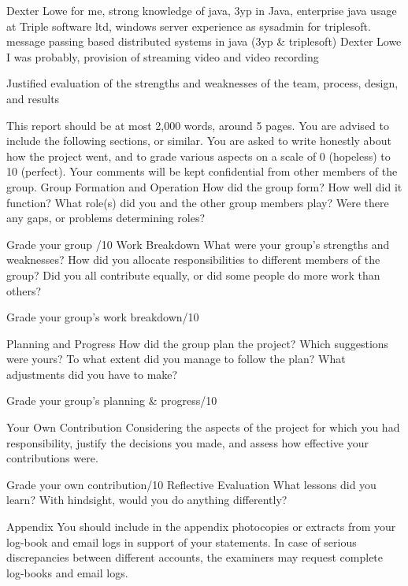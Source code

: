 Dexter Lowe for me, strong knowledge of java, 3yp in Java, enterprise java usage at Triple software ltd, windows server experience as sysadmin for triplesoft. message passing based distributed systems in java (3yp & triplesoft) Dexter Lowe I was probably, provision of streaming video and video recording



Justified evaluation of the strengths and weaknesses of the team, process, design, and results



 
 
This report should be at most 2,000 words, around 5 pages.  You are advised to include the following sections, or similar.   You are asked to write honestly about how the project went, and to grade various aspects on a scale of 0 (hopeless) to 10 (perfect).  Your comments will be kept confidential from other members of the group.
Group Formation and Operation
How did the group form?  How well did it function?  What role(s) did you and the other group members play?  Were there any gaps, or problems determining roles?
 
​Grade your group ​/10
Work Breakdown
What were your group’s strengths and weaknesses?  How did you allocate responsibilities to different members of the group?  Did you all contribute equally, or did some people do more work than others?
 
​Grade your group’s work breakdown​/10
 
Planning and Progress
How did the group plan the project?  Which suggestions were yours?  To what extent did you manage to follow the plan?  What adjustments did you have to make?
 
​Grade your group’s planning & progress​/10
 
Your Own Contribution
Considering the aspects of the project for which you had responsibility, justify the decisions you made, and assess how effective your contributions were.  
 
​Grade your own contribution​/10
Reflective Evaluation
What lessons did you learn?  With hindsight, would you do anything differently?
 
 
 
Appendix
You should include in the appendix photocopies or extracts from your log-book and email logs in support of your statements.  In case of serious discrepancies between different accounts, the examiners may request complete log-books and email logs.
 